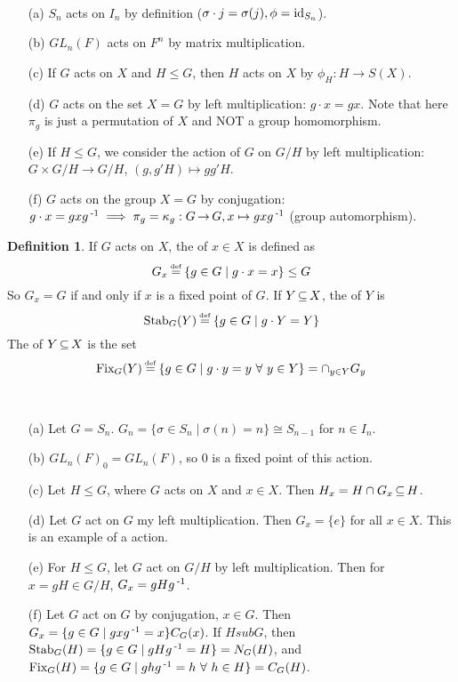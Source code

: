 \documentclass[11pt]{book}
\theoremstyle{definition}   \newtheorem{defn}[counter]{Definition} %
\newcommand\myeq{\mathrel{\overset{\makebox[0pt]{\mbox{\normalfont\tiny\sffamily \textrm{def}}}}{=}}}
\newcommand{\hm}{homomorphism}   \newcommand{\hms}{homomorphisms}   \newcommand{\iso}{isomorphism}
\DeclareMathOperator{\ra}{\rightarrow}   \DeclareMathOperator{\Poly}{\mathbf{P}}   \DeclareMathOperator{\spn}{\textnormal{span}}   \DeclareMathOperator{\aut}{\textnormal{Aut}}
\newcommand{\vs}{\vspace{8pt}}
\numberwithin{counter}{chapter}
\begin{document}
\begin{example}
\
\begin{enumerate}
\item[(a)] $S_n$ acts on $I_n$ by definition ($\sigma\cdot j = \sigma(j), \phi = \textnormal{id}_{S_n}$).
\item[(b)] $GL_n(F)$ acts on $F^n$ by matrix multiplication.
\item[(c)] If $G$ acts on $X$ and $H \leq G$, then $H$ acts on $X$ by $\phi_H : H \ra S(X)$.
\item[(d)] $G$ acts on the set $X=G$ by left multiplication: $g\cdot x = gx$. Note that here $\pi_g$ is just a permutation of $X$ and NOT a group \hm.
\item[(e)] If $H \leq G$, we consider the action of $G$ on $G/H$ by left multiplication: $G\times G/H \ra G/H$, $(g,g'H) \mapsto gg'H$.
\item[(f)] $G$ acts on the group $X=G$ by conjugation: $g\cdot x = gxg\inv \implies \pi_g = \kappa_g : G \ra G, x \mapsto gxg\inv$ (group automorphism).
\end{enumerate}
\end{example}

\vs

\begin{defn}
If $G$ acts on $X$, the  of $x \in X$ is defined as
	\[G_x \myeq \{g \in G \mid g\cdot x = x\} \leq G \]
So $G_x = G$ if and only if $x$ is a fixed point of $G$. If $Y \operatorname{\subseteq} X$, the  of $Y$ is
	\[\stab{G}{Y} \myeq \{g \in G \mid g\cdot Y = Y\} \]
The  of $Y \operatorname{\subseteq} X$ is the set
	\[\fix{G}{Y} \myeq \{g \in G \mid g\cdot y = y \ \forall \ y \in Y\} = \cap_{y\in Y} G_y \]
\end{defn}

\vs

\begin{example}
\
\begin{enumerate}
\item[(a)] Let $G = S_n$. $G_n = \{\sigma \in S_n \mid \sigma(n) = n\} \cong S_{n-1}$ for $n \in I_n$.
\item[(b)] $GL_n(F)_0 = GL_n(F)$, so $0$ is a fixed point of this action.
\item[(c)] Let $H \leq G$, where $G$ acts on $X$ and $x\in X$. Then $H_x = H\cap G_x \operatorname{\subseteq} H$.
\item[(d)] Let $G$ act on $G$ my left multiplication. Then $G_x = \{e\}$ for all $x \in X$. This is an example of a  action.
\item[(e)] For $H \leq G$, let $G$ act on $G/H$ by left multiplication. Then for $x = gH \in G/H$, $G_x = gHg\operatorname{^{-1}}$.
\item[(f)] Let $G$ act on $G$ by conjugation, $x \in G$. Then $G_x = \{g \in G \mid gxg\operatorname{^{-1}} = x\} C_G(x)$. If $H sub G$, then $\textnormal{Stab}_{G}(H) = \{g \in G \mid gHg\operatorname{^{-1}} = H\} = N_G(H)$, and $\textnormal{Fix}_{G}(H) = \{g\in G\mid ghg\operatorname{^{-1}} = h \ \forall \ h \in H\} = C_G(H)$.
\end{enumerate}
\end{example}
\end{document}
